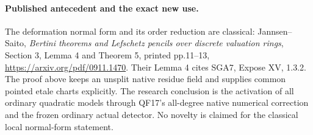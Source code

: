 \paragraph{Published antecedent and the exact new use.}
The deformation normal form and its order reduction
are classical: Jannsen--Saito, \emph{Bertini theorems
and Lefschetz pencils over discrete valuation rings},
Section 3, Lemma 4 and Theorem 5, printed pp.11--13,
\url{https://arxiv.org/pdf/0911.1470}.
Their Lemma 4 cites SGA7, Expose XV, 1.3.2.
The proof above keeps an unsplit native residue field
and supplies common pointed etale charts explicitly.
The research conclusion is the activation of all
ordinary quadratic models through QF17's all-degree
native numerical correction and the frozen ordinary
actual detector. No novelty is claimed for the
classical local normal-form statement.
